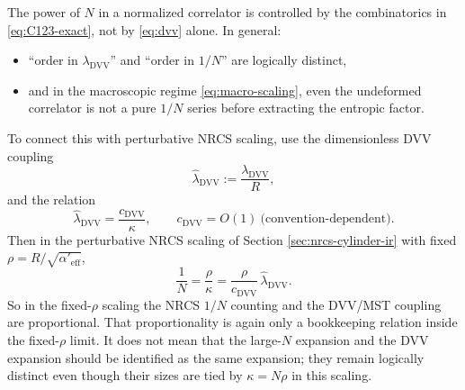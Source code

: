 \documentclass[11pt]{article}
\newcommand{\Aeff}{\alpha'_{\mathrm{eff}}}
\begin{document}
The power of $N$ in a normalized correlator is controlled by the combinatorics in \eqref{eq:C123-exact}, not by \eqref{eq:dvv} alone. In general:
\begin{itemize}
\item ``order in $\lambda_{\mathrm{DVV}}$'' and ``order in $1/N$'' are logically distinct,
\item and in the macroscopic regime \eqref{eq:macro-scaling}, even the undeformed correlator is not a pure $1/N$ series before extracting the entropic factor.
\end{itemize}
To connect this with perturbative NRCS scaling, use the dimensionless DVV coupling
\begin{equation}
\widehat\lambda_{\mathrm{DVV}}:=\frac{\lambda_{\mathrm{DVV}}}{R},
\end{equation}
and the relation
\begin{equation}\label{eq:dvv-kappa-relation}
\widehat\lambda_{\mathrm{DVV}}=\frac{c_{\mathrm{DVV}}}{\kappa},
\qquad
c_{\mathrm{DVV}}=O(1)\ \text{(convention-dependent)}.
\end{equation}
Then in the perturbative NRCS scaling of Section \ref{sec:nrcs-cylinder-ir} with fixed $\rho=R/\sqrt{\Aeff}$,
\begin{equation}
\frac{1}{N}=\frac{\rho}{\kappa}
=
\frac{\rho}{c_{\mathrm{DVV}}}\,\widehat\lambda_{\mathrm{DVV}}.
\end{equation}
So in the fixed-$\rho$ scaling the NRCS $1/N$ counting and the DVV/MST coupling are proportional.
That proportionality is again only a bookkeeping relation inside the fixed-$\rho$
limit. It does not mean that the large-$N$ expansion and the DVV expansion
should be identified as the same expansion; they remain logically distinct even
though their sizes are tied by $\kappa=N\rho$ in this scaling.
\end{document}
